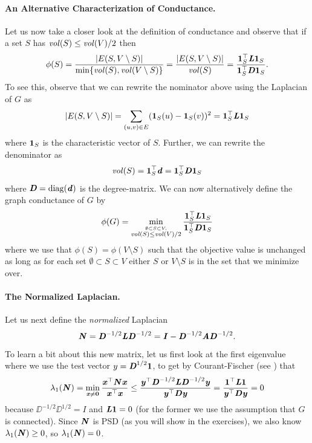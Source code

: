 \paragraph{An Alternative Characterization of Conductance.} Let us now take a closer look at the definition of conductance and observe that if a set $S$ has $\mathit{vol}(S) \leq \mathit{vol}(V)/2$ then
\[
\phi(S) = \frac{|E(S, V \setminus S)|}{ \min\{\mathit{vol}(S), \mathit{vol}(V \setminus S)\} } = \frac{|E(S, V \setminus S)|}{ \mathit{vol}(S) } = \frac{\boldsymbol{1}_S^\top \boldsymbol{\mathit{L}} \boldsymbol{1}_S}{\boldsymbol{1}_S^\top \boldsymbol{\mathit{D}} \boldsymbol{1}_S}.
\]
To see this, observe that we can rewrite the nominator above using the Laplacian of $G$ as
\[
|E(S, V \setminus S)| = \sum_{(u,v)\in E} (\boldsymbol{1}_S(u) - \boldsymbol{1}_S(v))^2 =  \boldsymbol{1}_S^\top \boldsymbol{\mathit{L}} \boldsymbol{1}_S
\]
where $\boldsymbol{1}_S$ is the characteristic vector of $S$. Further, we can rewrite the denominator as 
\[
\mathit{vol}(S) = \boldsymbol{1}_S^\top \boldsymbol{\mathit{d}} = \boldsymbol{1}_S^\top \boldsymbol{\mathit{D}} \boldsymbol{1}_S
\]
where $\boldsymbol{\mathit{D}} = \operatorname*{diag}(\boldsymbol{\mathit{d}})$ is the degree-matrix. We can now alternatively define the graph conductance of $G$ by
\begin{equation}\label{eq:conductanceAltDef}
\phi(G) = \min_{\stackrel{\emptyset \subset S \subset V,} {\mathit{vol}(S) \leq \mathit{vol}(V)/2}} \frac{\boldsymbol{1}_S^\top \boldsymbol{\mathit{L}} \boldsymbol{1}_S}{\boldsymbol{1}_S^\top \boldsymbol{\mathit{D}} \boldsymbol{1}_S} 
\end{equation}
where we use that $\phi(S) = \phi(V \setminus S)$ such that the objective value is unchanged as long as for each set $\emptyset \subset S \subset V$ either $S$ or $V \setminus S$ is in the set that we minimize over.

\paragraph{The Normalized Laplacian.} Let us next define the \emph{normalized} Laplacian \[
\boldsymbol{\mathit{N}} = \boldsymbol{\mathit{D}}^{-1/2} \boldsymbol{\mathit{L}} \boldsymbol{\mathit{D}}^{-1/2} = \boldsymbol{\mathit{I}} -  \boldsymbol{\mathit{D}}^{-1/2} \boldsymbol{\mathit{A}} \boldsymbol{\mathit{D}}^{-1/2}.
\]
To learn a bit about this new matrix, let us first look at the first eigenvalue where we use the test vector $y = \boldsymbol{\mathit{D}}^{1/2}\boldsymbol{1}$, to get by Courant-Fischer (see ) that
\begin{align}\label{eq:plugInNormalizedVector}
    \lambda_1(\boldsymbol{\mathit{N}}) =
    \min_{
      \substack{ \boldsymbol{\mathit{x}} \neq \boldsymbol{0}}
    }
    \frac{\boldsymbol{\mathit{x}}^\top \boldsymbol{\mathit{N}}\boldsymbol{\mathit{x}}}{\boldsymbol{\mathit{x}}^\top\boldsymbol{\mathit{x}}}  \leq \frac{\boldsymbol{\mathit{y}}^\top\boldsymbol{\mathit{D}}^{-1/2} \boldsymbol{\mathit{L}} \boldsymbol{\mathit{D}}^{-1/2} \boldsymbol{\mathit{y}}}{\boldsymbol{\mathit{y}}^\top\boldsymbol{\mathit{D}}\boldsymbol{\mathit{y}}} = \frac{\boldsymbol{1}^\top \boldsymbol{\mathit{L}} \boldsymbol{1}}{\boldsymbol{\mathit{y}}^\top\boldsymbol{\mathit{D}}\boldsymbol{\mathit{y}}} = 0
\end{align}
because $\DD^{-1/2} \DD^{1/2} = I$ and $\boldsymbol{\mathit{L}} \boldsymbol{1} = 0$ (for the former we use the assumption that $G$ is connected). Since $\boldsymbol{\mathit{N}}$ is PSD (as you will show in the exercises), we also know $\lambda_1(\boldsymbol{\mathit{N}}) \geq 0$, so $\lambda_1(\boldsymbol{\mathit{N}}) = 0$.

